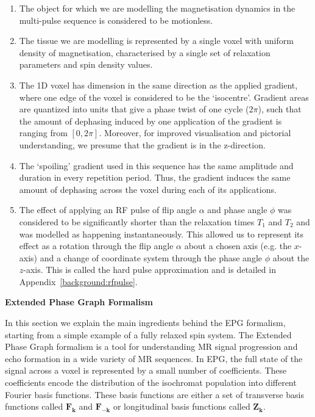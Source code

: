 \begin{enumerate}

    \item The object for which we are modelling the magnetisation dynamics in the multi-pulse sequence is considered to be motionless.

    \item The tissue we are modelling is represented by a single voxel with uniform density of magnetisation, characterised by a single set of relaxation parameters and spin density values.
    
    \item The 1D voxel has dimension in the same direction as the applied gradient, where one edge of the voxel is considered to be the `isocentre'.
    Gradient areas are quantized into units that give a phase twist of one cycle ($2\pi$), such that the amount of dephasing induced by one application of the gradient is ranging from $[0, 2\pi]$. 
    Moreover, for improved visualisation and pictorial understanding, we presume that the gradient is in the z-direction.

    \item The `spoiling' gradient used in this sequence has the same amplitude and duration in every repetition period.
    Thus, the gradient induces the same amount of dephasing across the voxel during each of its applications.
    
    \item The effect of applying an RF pulse of flip angle $\alpha$ and phase angle $\phi$ was considered to be significantly shorter than the relaxation times $T_1$ and $T_2$ and was modelled as happening instantaneously.
    This allowed us to represent its effect as a rotation through the flip angle $\alpha$ about a chosen axis (e.g. the $x$-axis) and a change of coordinate system through the phase angle $\phi$ about the $z$-axis.
    This is called the hard pulse approximation and is detailed in Appendix~\ref{background:rfpulse}.

\end{enumerate}

\hfill

\large \textbf{Extended Phase Graph Formalism} \normalsize

In this section we explain the main ingredients behind the EPG formalism, starting from a simple example of a fully relaxed spin system.
The Extended Phase Graph formalism is a tool for understanding MR signal progression and echo formation in a wide variety of MR sequences.
In EPG, the full state of the signal across a voxel is represented by a small number of coefficients.
These coefficients encode the distribution of the isochromat population into different Fourier basis functions.
These basis functions are either a set of transverse basis functions called $\bm{F_k}$ and $\bm{F_{-k}}$ or longitudinal basis functions called $\bm{Z_k}$.

